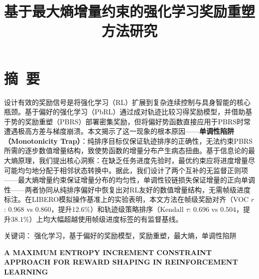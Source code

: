 

\renewcommand{\mytitle}{基于最大熵增量约束的强化学习奖励重塑方法研究}
\renewcommand{\mytitleEN}{A MAXIMUM ENTROPY INCREMENT CONSTRAINT APPROACH FOR REWARD SHAPING IN REINFORCEMENT LEARNING}


\setlength{\baselineskip}{20pt}

\title{\hei{}\bfseries\mytitle}
\maketitle
\thispagestyle{empty}
\clearpage



{\pagestyle{plain}
\tableofcontents
\clearpage}


\section*{摘~要}
设计有效的奖励信号是将强化学习（RL）扩展到复杂连续控制与具身智能的核心瓶颈。基于偏好的强化学习（PbRL）通过成对轨迹比较习得奖励模型，并借助基于势的奖励重塑（PBRS）部署密集奖励，但将偏好势函数直接应用于PBRS时常遭遇极高方差与梯度崩溃。本文揭示了这一现象的根本原因——\textbf{单调性陷阱（Monotonicity Trap）}：纯排序目标仅保证轨迹排序的正确性，无法约束PBRS所需的逐步数值增量结构，致使势函数的增量分布产生病态扭曲。基于信息论的最大熵原理，我们提出核心洞察：在缺乏任务进度先验时，最优约束应将进度增量尽可能均匀地分配于相邻状态转换中。据此，我们设计了两个互补的无监督正则项——最大熵增量约束保证增量分布的均匀性，单调性铰链损失保证增量的正向单调性——两者协同从纯排序偏好中恢复出对RL友好的数值增量结构，无需帧级进度标注。在LIBERO模拟操作基准上的实验表明，本文方法在帧级奖励对齐（VOC $r$: $0.968$ vs $0.860$，提升$12.6\%$）和轨迹级策略排序（Kendall $\tau$: $0.696$ vs $0.504$，提升$38.1\%$）上均大幅超越使用帧级进度标签的有监督基线。

\vspace{1em}\noindent
{\hei 关键词：}
{\song 强化学习，基于偏好的奖励模型，奖励重塑，最大熵，单调性陷阱}
\clearpage



{\centering{}\bfseries\sffamily \mytitleEN\par}
\vspace{1em}
